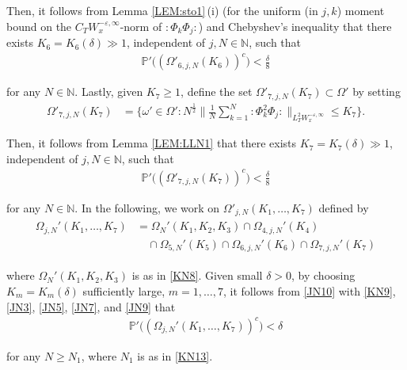 \documentclass[letterpaper, 11pt,  reqno]{amsart}
\newcommand{\1}{\hspace{0.5mm}\text{I}\hspace{0.2mm}}
\newcommand{\noi}{\noindent}
\newcommand{\N}{\mathbb{N}}
\newcommand{\PP}{\mathbb{P}}
\newcommand{\eps}{\varepsilon}
\newcommand{\dl}{\delta}
\newcommand{\wick}[1]{:\!{#1}\!:}
\renewcommand{\O}{\Omega}
\renewcommand{\o}{\omega}
\numberwithin{equation}{section}
\numberwithin{theorem}{section}
\begin{document}
\noi
Then, it follows from Lemma \ref{LEM:sto1}\,(i) 
(for the uniform (in $j, k$) moment bound
on the $C_T W^{-\eps, \infty}_x$-norm of $\wick{\Phi_k\Phi_j}$)
and  Chebyshev's  inequality
that 
there exists $K_6  = K_6(\dl) \gg1 $, independent of $j, N \in \N$,  such that 
\begin{align}
\PP'\big( (\O'_{6, j, N}(K_6))^c \big) < \frac \dl {8} 
\label{JN7}
\end{align}


\noi
for any $N \in \N$.
Lastly, 
given $K_7 \ge 1$, define 
the set $\O'_{7, j, N}(K_7)\subset \O'$
by setting
\begin{align}
\O'_{7, j, N}(K_7)
& = \Bigg\{\o' \in \O': 
N^{\frac 12 }
\bigg\| \frac{1}{N} \sum_{k = 1}^N \wick{\Phi_k^2 \Phi_j} 
\bigg\|_{ L_T^2 W_x^{- \eps, \infty}} \leq K_7 \Bigg\}.
\label{JN8}
\end{align}

\noi
Then, it follows from 
 Lemma \ref{LEM:LLN1}
that 
 there exists $K_7 = K_7(\dl) \gg1 $,
independent of $j, N \in \N$,  such that 
\begin{align}
\PP'\big( (\O'_{7, j, N}(K_7))^c \big) < \frac \dl 8
\label{JN9}
\end{align}


\noi
for any $N \in \N$.
In the following, we work on 
$\O'_{j, N} (K_1, \dots, K_7)$ defined by 
\begin{align}
\begin{split}
\O_{j, N}'  (K_1,\dots,  K_7)
& = 
\O_{N}'   (K_1, K_2, K_3)\cap 
\O_{4, j, N}'(K_4)\\
& \quad \cap  \O_{5, N}' (K_5) 
\cap \O_{6, j, N}' (K_6)
 \cap \O_{7, j,  N}' (K_7) 
\end{split}
\label{JN10}
\end{align}

\noi
where 
$\O_{ N}'  (K_1, K_2, K_3)$  is as in 
\eqref{KN8}.
Given small $\dl > 0$, 
by choosing 
  $K_m = K_m(\dl)$ sufficiently large, $m = 1, \dots,  7$, 
 it follows from 
\eqref{JN10}
with  \eqref{KN9}, \eqref{JN3}, 
\eqref{JN5}, \eqref{JN7},
and \eqref{JN9}
that 
\begin{align}
\PP'\big((\O_{j, N}'  ( K_1, \dots, K_7))^c\big) <  \dl 
\label{JN11}
\end{align}

\noi
for any $N \ge N_1$, 
where $N_1$ is as in \eqref{KN13}.
\end{document}
